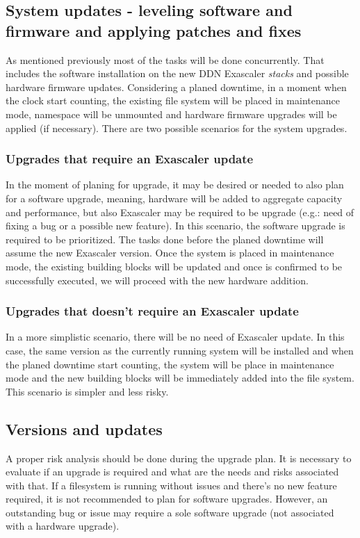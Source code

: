 \documentclass{article}
\begin{document}
\subsection{System updates - leveling software and firmware and applying patches and fixes}
As mentioned previously most of the tasks will be done concurrently. That includes the software installation on the new DDN Exascaler \textit{stacks} and possible hardware firmware updates. Considering a planed downtime, in a moment when the clock start counting, the existing file system will be placed in maintenance mode, namespace will be unmounted and hardware firmware upgrades will be applied (if necessary). There are two possible scenarios for the system upgrades.
\subsubsection{Upgrades that require an Exascaler update}
In the moment of planing for upgrade, it may be desired or needed to also plan for a software upgrade, meaning, hardware will be added to aggregate capacity and performance, but also Exascaler may be required to be upgrade (e.g.: need of fixing a bug or a possible new feature). In this scenario, the software upgrade is required to be prioritized. The tasks done before the planed downtime will assume the new Exascaler version. Once the system is placed in maintenance mode, the existing building blocks will be updated and once is confirmed to be successfully executed, we will proceed with the new hardware addition.

\subsubsection{Upgrades that doesn't require an Exascaler update}
In a more simplistic scenario, there will be no need of Exascaler update. In this case, the same version as the currently running system will be installed and when the planed downtime start counting, the system will be place in maintenance mode and the new building blocks will be immediately added into the file system. This scenario is simpler and less risky.

\subsection{Versions and updates}
A proper risk analysis should be done during the upgrade plan. It is necessary to evaluate if an upgrade is required and what are the needs and risks associated with that. If a filesystem is running without issues and there's no new feature required, it is not recommended to plan for software upgrades. However, an outstanding bug or issue may require a sole software upgrade (not associated with a hardware upgrade).
\end{document}
